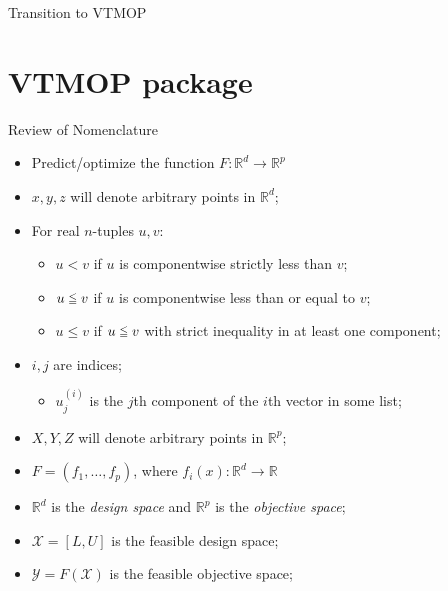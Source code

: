 \documentclass[xcolor=dvipsnames]{beamer}
\def\lee{\mathrel{\vcenter{\hbox{$\scriptstyle\mathord<$}\nointerlineskip
\vskip 1pt\hbox{$\scriptstyle\mathord=$}}}}
\begin{document}
\begin{frame}{Transition to VTMOP}
\tableofcontents
\end{frame}

\section{VTMOP package}
\begin{frame}{Review of Nomenclature}
\begin{itemize}
\item Predict/optimize the function $F : \mathbb{R}^d\rightarrow\mathbb{R}^p$
\item $x,y,z$ will denote arbitrary points in $\mathbb{R}^d$;
\item For real $n$-tuples $u,v$:
\begin{itemize}
\item $u < v$ if $u$ is componentwise strictly less than $v$;
\item $u \lee v$ if $u$ is componentwise less than or equal to $v$;
\item $u \leq v$ if $u \lee v$ with strict inequality in at least one component;
\end{itemize}
\item $i,j$ are indices;
\begin{itemize}
\item $u^{(i)}_j$ is the $j$th component of the $i$th vector in some list;
\end{itemize}
\pause
\item $X,Y,Z$ will denote arbitrary points in $\mathbb{R}^p$;
\item $F = (f_1, \ldots, f_p)$, where $f_i(x) : \mathbb{R}^d \rightarrow \mathbb{R}$
\item $\mathbb{R}^d$ is the {\it design space} and $\mathbb{R}^p$ is the {\it objective space};
\item $\mathcal{X} = [L,U]$ is the feasible design space;
\item $\mathcal{Y} = F(\mathcal{X})$ is the feasible objective space;
\end{itemize}
\end{frame}
\end{document}
